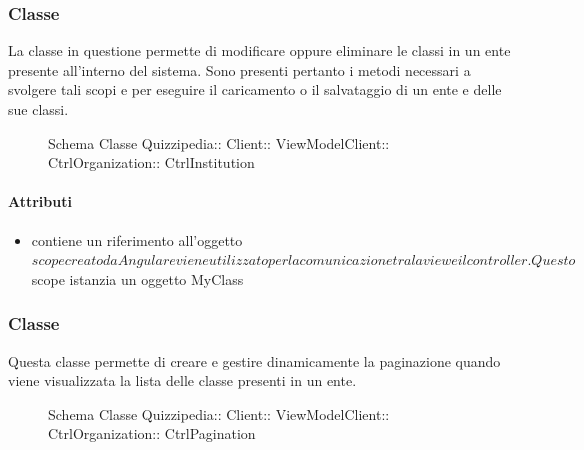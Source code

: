 \subsubsection{Classe }
La classe in questione permette di modificare oppure eliminare le classi in un ente presente all'interno del sistema.
Sono presenti pertanto i metodi necessari a svolgere tali scopi e per eseguire il caricamento o il salvataggio di un ente e delle sue classi.
\begin{figure}[H]
\centering
\noindent{}
\caption[Schema Classe CtrlInstitution]{Schema Classe Quizzipedia:: Client:: ViewModelClient:: CtrlOrganization:: CtrlInstitution}
\end{figure}
\paragraph{Attributi}
\begin{itemize}
\item {}
\newline
contiene un riferimento all'oggetto $scope creato da Angular e viene utilizzato per la comunicazione tra la view e il controller. Questo $scope istanzia un oggetto MyClass
\end{itemize}
\subsubsection{Classe }
Questa classe permette di creare e gestire dinamicamente la paginazione quando viene visualizzata la lista delle classe presenti in un ente.
\begin{figure}[H]
\centering
\noindent{}
\caption[Schema Classe CtrlPagination]{Schema Classe Quizzipedia:: Client:: ViewModelClient:: CtrlOrganization:: CtrlPagination}
\end{figure}
